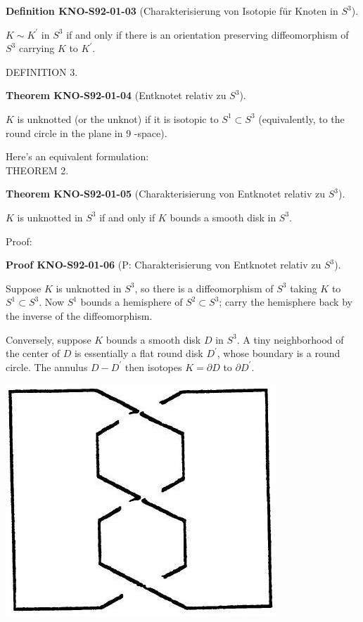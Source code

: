 \documentclass[10pt, letterpaper]{article}
\newcommand{\CustomHeading}[3]{%
  \par\medskip\noindent%
  \textbf{#1 #2} \textnormal{(#3)}.\enskip%
}
\newenvironment{DEF}[2]{\begin{unitbox}\CustomHeading{Definition}{#1}{#2}}{\end{unitbox}}
\newenvironment{THEO}[2]{\begin{unitbox}\CustomHeading{Theorem}{#1}{#2}}{\end{unitbox}}
\newenvironment{PROOF}[2]{\begin{unitbox}\CustomHeading{Proof}{#1}{#2}}{\end{unitbox}}
\begin{document}
\begin{DEF}{KNO-S92-01-03}{Charakterisierung von Isotopie für Knoten in $S^3$}
$K \sim K^{\prime}$ in $S^{3}$ if and only if there is an orientation preserving diffeomorphism of $S^{3}$ carrying $K$ to $K^{\prime}$.
\end{DEF}

DEFINITION 3. 

\begin{THEO}{KNO-S92-01-04}{Entknotet relativ zu $S^3$}
$K$ is unknotted (or the unknot) if it is isotopic to $S^{1} \subset S^{3}$ (equivalently, to the round circle in the plane in 9 -space).
\end{THEO}

Here's an equivalent formulation:\\
THEOREM 2. 

\begin{THEO}{KNO-S92-01-05}{Charakterisierung von Entknotet relativ zu $S^3$}
$K$ is unknotted in $S^{3}$ if and only if $K$ bounds a smooth disk in $S^{3}$.
\end{THEO}

Proof: 

\begin{PROOF}{KNO-S92-01-06}{P: Charakterisierung von Entknotet relativ zu $S^3$}
Suppose $K$ is unknotted in $S^{3}$, so there is a diffeomorphism of $S^{3}$ taking $K$ to $S^{1} \subset S^{3}$. Now $S^{1}$ bounds a hemisphere of $S^{2} \subset S^{3}$; carry the hemisphere back by the inverse of the diffeomorphism.

Conversely, suppose $K$ bounds a smooth disk $D$ in $S^{3}$. A tiny neighborhood of the center of $D$ is essentially a flat round disk $D^{\prime}$, whose boundary is a round circle. The annulus $D-D^{\prime}$ then isotopes $K=\partial D$ to $\partial D^{\prime}$.
\end{PROOF}


\includegraphics[scale=0.2, center]{2025_05_21_037de704f595ce642d3eg-078(1)}
\end{document}
